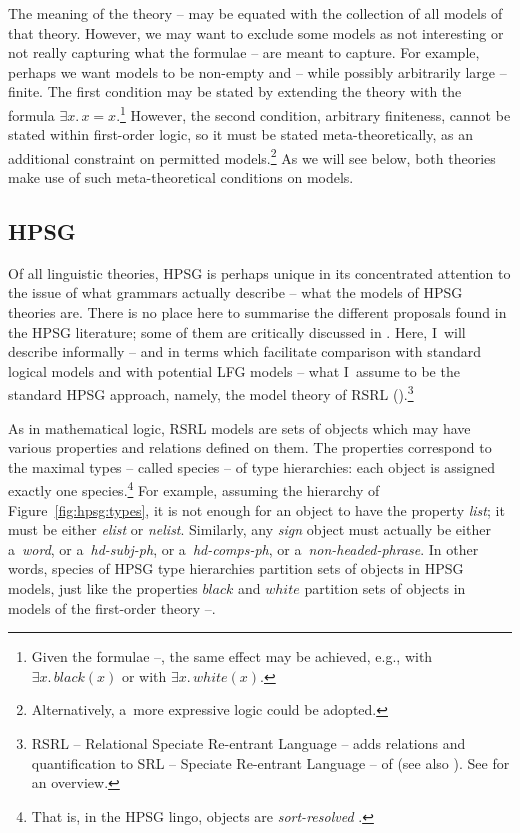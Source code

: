 \documentclass[output=paper,hidelinks]{langscibook}
\begin{document}
\largerpage
The meaning of the theory -- may be equated with the collection of all models of that theory.  However, we may want to exclude some models as not interesting or not really capturing what the formulae -- are meant to capture.  For example, perhaps we want models to be non-empty and -- while possibly arbitrarily large -- finite.  The first condition may be stated by extending the theory with the formula $\exists x.\, x=x$.\footnote{Given the formulae --, the same effect may be achieved, e.g., with $\exists x.\, \mathit{black}(x)$ or with $\exists x.\, \mathit{white}(x)$.}  However, the second condition, arbitrary finiteness, cannot be stated within first-order logic, so it must be stated meta-theoretically, as an additional constraint on permitted models.\footnote{Alternatively, a~more expressive logic could be adopted.}  As we will see below, both theories make use of such meta-theoretical conditions on models.


\subsection{HPSG}
\largerpage
\label{sec:mod:hpsg}

Of all linguistic theories, HPSG is perhaps unique in its concentrated attention to the issue of what grammars actually describe -- what the models of HPSG theories are.  There is no place here to summarise the different proposals found in the HPSG literature; some of them are critically discussed in \citet[Section {2.2}]{rich:04}.  Here, I~will describe informally -- and in terms which facilitate comparison with standard logical models and with potential LFG models -- what I~assume to be the standard HPSG approach, namely, the model theory of RSRL (\citealt{rich:98a,rich:04}).\footnote{RSRL -- Relational Speciate Re-entrant Language -- adds relations and quantification to SRL -- Speciate Re-entrant Language -- of \citealt{king:89,king:99} (see also \citealt{poll:98}). See \citealt{rich:20} for an overview.}

As in mathematical logic, RSRL models are sets of objects which may have various properties and relations defined on them.  The properties correspond to the maximal types -- called species -- of type hierarchies: each object is assigned exactly one species.\footnote{That is, in the HPSG lingo, objects are \emph{sort-resolved} \citep[18]{pollard1994head-driven}.}  For example, assuming the hierarchy of Figure~\ref{fig:hpsg:types}, it is not enough for an object to have the property \textit{list}; it must be either \textit{elist} or \textit{nelist}.  Similarly, any \textit{sign} object must actually be either a~\textit{word}, or a~\textit{hd-subj-ph}, or a~\textit{hd-comps-ph}, or a~\textit{non-headed-phrase}.  In other words, species of HPSG type hierarchies partition sets of objects in HPSG models, just like the properties $\mathit{black}$ and $\mathit{white}$ partition sets of objects in models of the first-order theory --.
\end{document}
